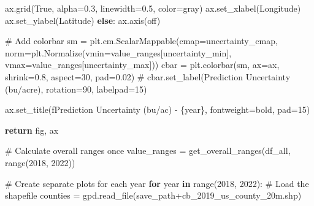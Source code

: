 \documentclass[
  letterpaper,
  DIV=11,
  numbers=noendperiod]{scrreprt}
\newenvironment{Shaded}{\begin{snugshade}}{\end{snugshade}}
\newcommand{\BuiltInTok}[1]{\textcolor[rgb]{0.00,0.23,0.31}{#1}}
\newcommand{\CommentTok}[1]{\textcolor[rgb]{0.37,0.37,0.37}{#1}}
\newcommand{\ControlFlowTok}[1]{\textcolor[rgb]{0.00,0.23,0.31}{\textbf{#1}}}
\newcommand{\DecValTok}[1]{\textcolor[rgb]{0.68,0.00,0.00}{#1}}
\newcommand{\FloatTok}[1]{\textcolor[rgb]{0.68,0.00,0.00}{#1}}
\newcommand{\KeywordTok}[1]{\textcolor[rgb]{0.00,0.23,0.31}{\textbf{#1}}}
\newcommand{\NormalTok}[1]{\textcolor[rgb]{0.00,0.23,0.31}{#1}}
\newcommand{\OperatorTok}[1]{\textcolor[rgb]{0.37,0.37,0.37}{#1}}
\newcommand{\SpecialCharTok}[1]{\textcolor[rgb]{0.37,0.37,0.37}{#1}}
\newcommand{\SpecialStringTok}[1]{\textcolor[rgb]{0.13,0.47,0.30}{#1}}
\newcommand{\StringTok}[1]{\textcolor[rgb]{0.13,0.47,0.30}{#1}}
\newcommand{\VariableTok}[1]{\textcolor[rgb]{0.07,0.07,0.07}{#1}}
\begin{document}
\begin{Shaded}
\begin{Highlighting}[]
\NormalTok{        ax.grid(}\VariableTok{True}\NormalTok{, alpha}\OperatorTok{=}\FloatTok{0.3}\NormalTok{, linewidth}\OperatorTok{=}\FloatTok{0.5}\NormalTok{, color}\OperatorTok{=}\StringTok{\textquotesingle{}gray\textquotesingle{}}\NormalTok{)}
\NormalTok{        ax.set\_xlabel(}\StringTok{\textquotesingle{}Longitude\textquotesingle{}}\NormalTok{)}
\NormalTok{        ax.set\_ylabel(}\StringTok{\textquotesingle{}Latitude\textquotesingle{}}\NormalTok{)}
    \ControlFlowTok{else}\NormalTok{:}
\NormalTok{        ax.axis(}\StringTok{\textquotesingle{}off\textquotesingle{}}\NormalTok{)}

    \CommentTok{\# Add colorbar}
\NormalTok{    sm }\OperatorTok{=}\NormalTok{ plt.cm.ScalarMappable(cmap}\OperatorTok{=}\NormalTok{uncertainty\_cmap,}
\NormalTok{                              norm}\OperatorTok{=}\NormalTok{plt.Normalize(vmin}\OperatorTok{=}\NormalTok{value\_ranges[}\StringTok{\textquotesingle{}uncertainty\_min\textquotesingle{}}\NormalTok{],}
\NormalTok{                                               vmax}\OperatorTok{=}\NormalTok{value\_ranges[}\StringTok{\textquotesingle{}uncertainty\_max\textquotesingle{}}\NormalTok{]))}
\NormalTok{    cbar }\OperatorTok{=}\NormalTok{ plt.colorbar(sm, ax}\OperatorTok{=}\NormalTok{ax, shrink}\OperatorTok{=}\FloatTok{0.8}\NormalTok{, aspect}\OperatorTok{=}\DecValTok{30}\NormalTok{, pad}\OperatorTok{=}\FloatTok{0.02}\NormalTok{)}
    \CommentTok{\# cbar.set\_label(\textquotesingle{}Prediction Uncertainty (bu/acre)\textquotesingle{}, rotation=90, labelpad=15)}

\NormalTok{    ax.set\_title(}\SpecialStringTok{f\textquotesingle{}Prediction Uncertainty (bu/ac) {-} }\SpecialCharTok{\{}\NormalTok{year}\SpecialCharTok{\}}\SpecialStringTok{\textquotesingle{}}\NormalTok{, fontweight}\OperatorTok{=}\StringTok{\textquotesingle{}bold\textquotesingle{}}\NormalTok{, pad}\OperatorTok{=}\DecValTok{15}\NormalTok{)}

    \ControlFlowTok{return}\NormalTok{ fig, ax}


\CommentTok{\# Calculate overall ranges once}
\NormalTok{value\_ranges }\OperatorTok{=}\NormalTok{ get\_overall\_ranges(df\_all, }\BuiltInTok{range}\NormalTok{(}\DecValTok{2018}\NormalTok{, }\DecValTok{2022}\NormalTok{))}

\CommentTok{\# Create separate plots for each year}
\ControlFlowTok{for}\NormalTok{ year }\KeywordTok{in} \BuiltInTok{range}\NormalTok{(}\DecValTok{2018}\NormalTok{, }\DecValTok{2022}\NormalTok{):}
    \CommentTok{\# Load the shapefile}
\NormalTok{    counties }\OperatorTok{=}\NormalTok{ gpd.read\_file(save\_path}\OperatorTok{+}\StringTok{\textquotesingle{}cb\_2019\_us\_county\_20m.shp\textquotesingle{}}\NormalTok{)}


\end{Highlighting}
\end{Shaded}
\end{document}
